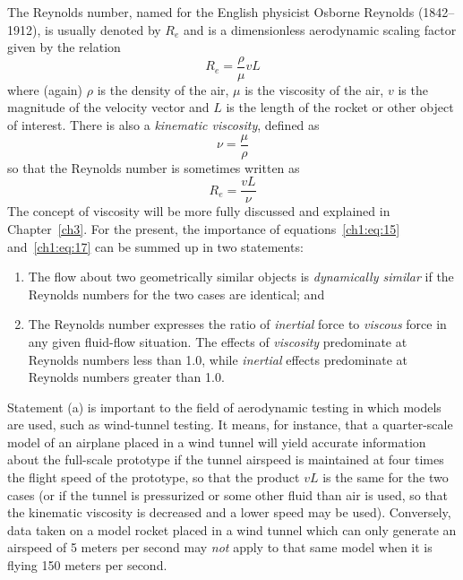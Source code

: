 The Reynolds number, named for the English physicist Osborne Reynolds
(1842--1912), is usually denoted by $R_e$ and is a dimensionless aerodynamic
scaling factor given by the relation
\begin{equation}\label{ch1:eq:15}
R_e = \frac{\rho}{\mu} vL
\end{equation}
where (again) $\rho$ is the density of the air, $\mu$ is the viscosity of the
air, $v$ is the magnitude of the velocity vector and $L$ is the length of the
rocket or other object of interest. There is also a \emph{kinematic viscosity},
defined as
\begin{equation}\label{ch1:eq:16}
\nu = \frac{\mu}{\rho}
\end{equation}
so that the Reynolds number is sometimes written as
\begin{equation}\label{ch1:eq:17}
R_e = \frac{vL}{\nu}
\end{equation}
The concept of viscosity will be more fully discussed and explained in
Chapter~\ref{ch3}. For the present, the importance of
equations~\eqref{ch1:eq:15} and~\eqref{ch1:eq:17} can be summed up in two
statements:
\begin{enumerate}[label=(\alph*)]
  \item The flow about two geometrically similar objects is \emph{dynamically
  similar} if the Reynolds numbers for the two cases are identical; and
  \item The Reynolds number expresses the ratio of \emph{inertial} force to
  \emph{viscous} force in any given fluid-flow situation. The effects of
  \emph{viscosity} predominate at Reynolds numbers less than 1.0, while
  \emph{inertial} effects predominate at Reynolds numbers greater than 1.0.
\end{enumerate}
Statement (a) is important to the field of aerodynamic testing in which models
are used, such as wind-tunnel testing. It means, for instance, that a
quarter-scale model of an airplane placed in a wind tunnel will yield accurate
information about the full-scale prototype if the tunnel airspeed is maintained
at four times the flight speed of the prototype, so that the product $vL$ is
the same for the two cases (or if the tunnel is pressurized or some other fluid
than air is used, so that the kinematic viscosity is decreased and a lower
speed may be used). Conversely, data taken on a model rocket placed in a wind
tunnel which can only generate an airspeed of 5 meters per second may
\emph{not} apply to that same model when it is flying 150 meters per second.

